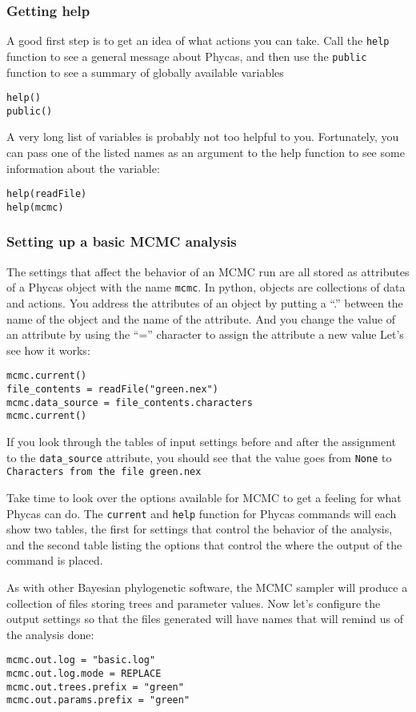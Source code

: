 \documentclass{article}
\newcommand{\cmdopt}[1]{\texttt{#1}\xspace}
\newcommand{\cmd}[1]{\texttt{#1}\xspace}
\newcommand{\phycas}{Phycas\xspace}
\begin{document}
\subsubsection{Getting help}
A good first step is to get an idea of what actions you can take. 
Call the \cmd{help} function to see a general message about \phycas, and then
use the \cmd{public} function to see a summary of globally available
variables
\begin{verbatim}
help()
public()
\end{verbatim}

A very long list of variables is probably not too helpful to you.
Fortunately, you can pass one of the listed names as an argument
to the help function to see some information about the variable:
\begin{verbatim}
help(readFile)
help(mcmc)
\end{verbatim}

\subsubsection{Setting up a basic MCMC analysis}
The settings that affect the behavior of an MCMC run are all stored
as attributes of a \phycas object with the name \cmd{mcmc}.
In python, objects are collections of data and actions.
You address the attributes of an object by putting a ``.'' between
the name of the object and the name of the attribute.
And you change the value of an attribute by using the ``='' character
to assign the attribute a new value
Let's see how it works:
\begin{verbatim}
mcmc.current()
file_contents = readFile("green.nex")
mcmc.data_source = file_contents.characters
mcmc.current()
\end{verbatim}
If you look through the tables of input settings before and after
the assignment to the \cmdopt{data\_source} attribute, you should see
that the value goes from \cmd{None} to \cmd{Characters from the file green.nex}

Take time to look over the options available for MCMC to get a feeling for
what \phycas can do.
The \cmd{current} and \cmd{help} function for \phycas commands will 
each show two tables, the first for settings that control the behavior
of the analysis, and the second table listing the options that control
the where the output of the command is placed.

As with other Bayesian phylogenetic software, the MCMC sampler will produce a collection of files storing
trees and parameter values.
Now let's configure the output settings so that the files generated will have names that 
will remind us of the analysis done:
\begin{verbatim}
mcmc.out.log = "basic.log"
mcmc.out.log.mode = REPLACE
mcmc.out.trees.prefix = "green"
mcmc.out.params.prefix = "green"
\end{verbatim}
\end{document}
